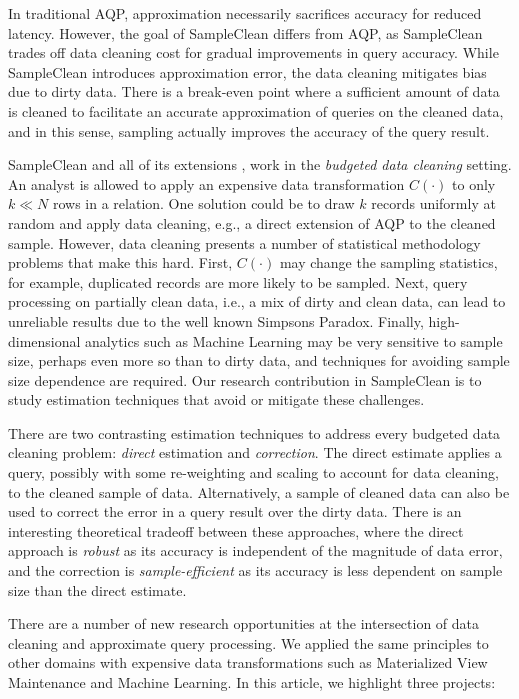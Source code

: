 In traditional AQP, approximation necessarily sacrifices accuracy for reduced latency. 
However, the goal of SampleClean differs from AQP, as SampleClean trades off data cleaning cost for gradual improvements in query accuracy.
While SampleClean introduces approximation error, the data cleaning mitigates bias due to dirty data.
There is a break-even point where a sufficient amount of data is cleaned to facilitate an accurate approximation of queries on the cleaned data, and in this sense, sampling actually improves the accuracy of the query result.

SampleClean \cite{wang1999sample} and all of its extensions \cite{krishnan2015svc,krishnan2015acl,haas2015wisteria}, work in the \emph{budgeted data cleaning} setting. 
An analyst is allowed to apply an expensive data transformation $C(\cdot)$ to only $k\ll N$ rows in a relation.
One solution could be to draw $k$ records uniformly at random and apply data cleaning, e.g., a direct extension of AQP \cite{DBLP:conf/eurosys/AgarwalMPMMS13} to the cleaned sample.
However, data cleaning presents a number of statistical methodology problems that make this hard.
First, $C(\cdot)$ may change the sampling statistics, for example, duplicated records are more likely to be sampled.
Next, query processing on partially clean data, i.e., a mix of dirty and clean data, can lead to unreliable results due to the well known Simpsons Paradox.
Finally, high-dimensional analytics such as Machine Learning may be very sensitive to sample size, perhaps even more so than to dirty data, and techniques for avoiding sample size dependence are required.
Our research contribution in SampleClean is to study estimation techniques that avoid or mitigate these challenges.

There are two contrasting estimation techniques to address every budgeted data cleaning problem: \emph{direct} estimation and \emph{correction}.
The direct estimate applies a query, possibly with some re-weighting and scaling to account for data cleaning, to the cleaned sample of data. 
Alternatively, a sample of cleaned data can also be used to correct the error in a query result over the dirty data.
There is an interesting theoretical tradeoff between these approaches, where the direct approach is \emph{robust} as its accuracy is independent of the magnitude of data error, and the correction is \emph{sample-efficient} as its accuracy is less dependent on sample size than the direct estimate.

There are a number of new research opportunities at the intersection of data cleaning and approximate query processing.
We applied the same principles to other domains with expensive data transformations such as Materialized View Maintenance and Machine Learning.
In this article, we highlight three projects:

